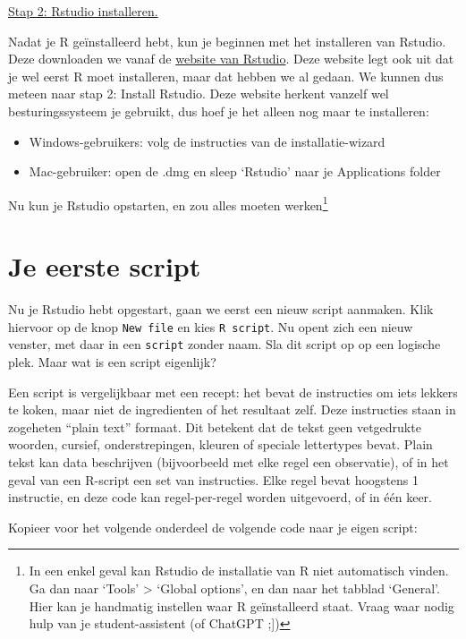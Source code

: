 \documentclass[
  b5paper,
  DIV=11,
  numbers=noendperiod]{scrreprt}
\theoremstyle{definition}
\theoremstyle{remark}
\begin{document}
\ul{Stap 2: Rstudio installeren.}

Nadat je R geïnstalleerd hebt, kun je beginnen met het installeren van
Rstudio. Deze downloaden we vanaf de
\href{https://posit.co/download/rstudio-desktop/}{website van Rstudio}.
Deze website legt ook uit dat je wel eerst R moet installeren, maar dat
hebben we al gedaan. We kunnen dus meteen naar stap 2: Install Rstudio.
Deze website herkent vanzelf wel besturingssysteem je gebruikt, dus hoef
je het alleen nog maar te installeren:

\begin{itemize}
\item
  Windows-gebruikers: volg de instructies van de installatie-wizard
\item
  Mac-gebruiker: open de .dmg en sleep `Rstudio' naar je Applications
  folder
\end{itemize}

Nu kun je Rstudio opstarten, en zou alles moeten werken\footnote{In een
  enkel geval kan Rstudio de installatie van R niet automatisch vinden.
  Ga dan naar `Tools' \textgreater{} `Global options', en dan naar het
  tabblad `General'. Hier kan je handmatig instellen waar R
  geïnstalleerd staat. Vraag waar nodig hulp van je student-assistent
  (of ChatGPT ;{]})}

\section{Je eerste script}\label{je-eerste-script}

Nu je Rstudio hebt opgestart, gaan we eerst een nieuw script aanmaken.
Klik hiervoor op de knop \texttt{New\ file} en kies \texttt{R\ script}.
Nu opent zich een nieuw venster, met daar in een \texttt{script} zonder
naam. Sla dit script op op een logische plek. Maar wat is een script
eigenlijk?

Een script is vergelijkbaar met een recept: het bevat de instructies om
iets lekkers te koken, maar niet de ingredienten of het resultaat zelf.
Deze instructies staan in zogeheten ``plain text'' formaat. Dit betekent
dat de tekst geen vetgedrukte woorden, cursief, onderstrepingen, kleuren
of speciale lettertypes bevat. Plain tekst kan data beschrijven
(bijvoorbeeld met elke regel een observatie), of in het geval van een
R-script een set van instructies. Elke regel bevat hoogstens 1
instructie, en deze code kan regel-per-regel worden uitgevoerd, of in
één keer.

Kopieer voor het volgende onderdeel de volgende code naar je eigen
script:
\end{document}
